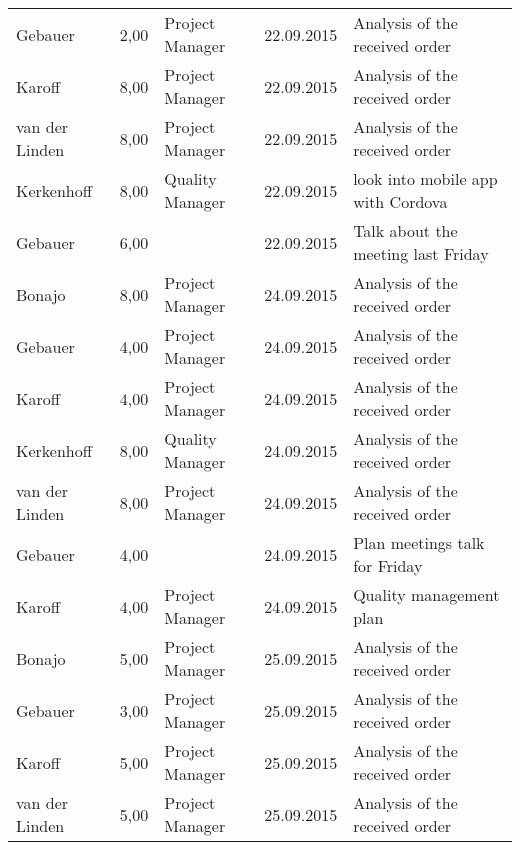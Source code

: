 \begin{longtable}{ l r p{2cm} c p{4cm} }
		Gebauer                 & 2,00           & Project Manager & 22.09.2015    & Analysis of the received order               \\
		Karoff                  & 8,00           & Project Manager & 22.09.2015    & Analysis of the received order               \\
		van der Linden          & 8,00           & Project Manager & 22.09.2015    & Analysis of the received order               \\
		Kerkenhoff              & 8,00           & Quality Manager & 22.09.2015    & look into mobile app with Cordova            \\
		Gebauer                 & 6,00           &                 & 22.09.2015    & Talk about the meeting last Friday           \\
		Bonajo                  & 8,00           & Project Manager & 24.09.2015    & Analysis of the received order               \\
		Gebauer                 & 4,00           & Project Manager & 24.09.2015    & Analysis of the received order               \\
		Karoff                  & 4,00           & Project Manager & 24.09.2015    & Analysis of the received order               \\
		Kerkenhoff              & 8,00           & Quality Manager & 24.09.2015    & Analysis of the received order               \\
		van der Linden          & 8,00           & Project Manager & 24.09.2015    & Analysis of the received order               \\
		Gebauer                 & 4,00           &                 & 24.09.2015    & Plan meetings talk for Friday                \\
		Karoff                  & 4,00           & Project Manager & 24.09.2015    & Quality management plan                      \\
		Bonajo                  & 5,00           & Project Manager & 25.09.2015    & Analysis of the received order               \\
		Gebauer                 & 3,00           & Project Manager & 25.09.2015    & Analysis of the received order               \\
		Karoff                  & 5,00           & Project Manager & 25.09.2015    & Analysis of the received order               \\
		van der Linden          & 5,00           & Project Manager & 25.09.2015    & Analysis of the received order               \\

\end{longtable}
